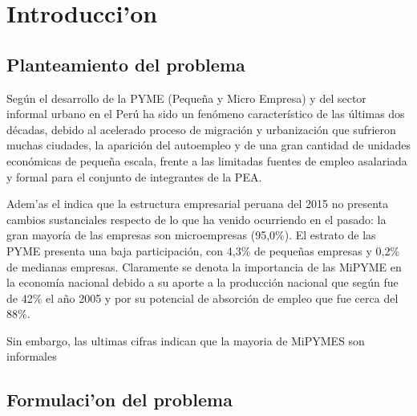 
\chapter{Introducci'on}

\section{Planteamiento del problema}
Seg\'un \cite{arbulu} el desarrollo de la PYME (Peque\~na y  Micro  Empresa) y
del  sector  informal  urbano  en  el  Per\'u  ha  sido un fen\'omeno caracter\'istico
de las \'ultimas  dos  d\'ecadas,  debido  al acelerado proceso de migraci\'on y urbanizaci\'on
que  sufrieron  muchas ciudades, la aparici\'on del autoempleo y de una gran cantidad
de  unidades  econ\'omicas  de  peque\~na  escala,  frente  a  las  limitadas  fuentes
de  empleo  asalariada y formal para el conjunto de integrantes de la PEA.

Adem'as el \cite{produce} indica que la estructura empresarial peruana del 2015 no
presenta cambios sustanciales respecto de lo que ha venido ocurriendo en el pasado:
la gran mayor\'ia de las empresas son microempresas (95,0\%). El estrato de las
PYME presenta una baja participaci\'on, con 4,3\% de peque\~nas empresas y 0,2\% de
medianas empresas. Claramente se denota la importancia de las MiPYME en la econom\'ia
nacional debido a su aporte a la producci\'on nacional que seg\'un \citep{arbulu} fue de 42\%
el a\~no 2005 y por su potencial de absorci\'on de empleo que fue cerca del 88\%.

Sin embargo, las ultimas cifras indican que la mayoria de MiPYMES son informales

\section{Formulaci'on del problema}
